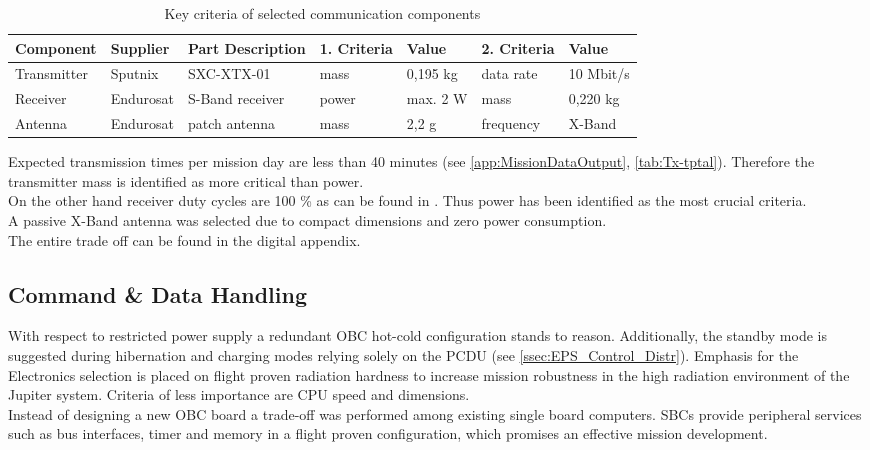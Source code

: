 \begin{table}[h]
\centering
\caption{Key criteria of selected communication components}
\begin{tabular}{lll|ll|ll}
\toprule
Component   & Supplier  & Part Description     & 1. Criteria   & Value    & 2. Criteria & Value          \\
\midrule
Transmitter & Sputnix   & SXC-XTX-01           & mass          & 0,195 kg & data rate   & 10 Mbit/s \\
Receiver    & Endurosat & S-Band receiver      & power         & max. 2 W & mass        & 0,220 kg       \\
Antenna     & Endurosat & patch antenna & mass          & 2,2 g    & frequency   & X-Band         \\
\bottomrule
\end{tabular}
\label{tab:ComCompComp}
\end{table}

Expected transmission times per mission day are less than 40 minutes (see \autoref{app:MissionDataOutput}, \autoref{tab:Tx-tptal}). Therefore the transmitter mass is identified as more critical than power. \\
On the other hand receiver duty cycles are 100 \% as can be found in \cite{tab:powerbudgetcomplete}. Thus power has been identified as the most crucial criteria. \\
A passive X-Band antenna was selected due to compact dimensions and zero power consumption.  \\
The entire trade off can be found in the digital appendix.

 \subsection{Command \& Data Handling} \label{C&DH}
 
 With respect to restricted power supply a redundant OBC hot-cold configuration stands to reason. Additionally, the standby mode is suggested during hibernation and charging modes relying solely on the PCDU (see \autoref{ssec:EPS_Control_Distr}). 
Emphasis for the Electronics selection is placed on flight proven radiation hardness to increase mission robustness in the high radiation environment of the Jupiter system. 
Criteria of less importance are CPU speed and dimensions. \\

Instead of designing a new OBC board a trade-off was performed among existing single board computers. SBCs provide peripheral services such as bus interfaces, timer and memory in a flight proven configuration, which promises an effective mission development. \\

